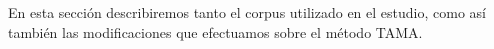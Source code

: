 En esta sección describiremos tanto el corpus utilizado en el estudio, como así también las modificaciones que efectuamos sobre el método TAMA.






